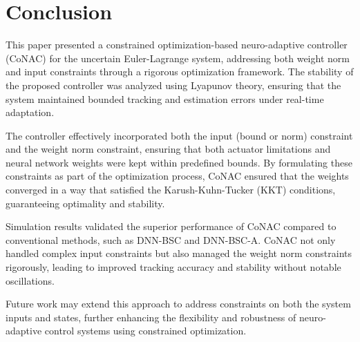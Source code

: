 \documentclass[lettersize,journal]{IEEEtran}
\begin{document}

\section{Conclusion}\label{sec:conclusion}

This paper presented a constrained optimization-based neuro-adaptive controller (CoNAC) for the uncertain Euler-Lagrange system, addressing both weight norm and input constraints through a rigorous optimization framework. The stability of the proposed controller was analyzed using Lyapunov theory, ensuring that the system maintained bounded tracking and estimation errors under real-time adaptation.

The controller effectively incorporated both the input (bound or norm) constraint and the weight norm constraint, ensuring that both actuator limitations and neural network weights were kept within predefined bounds. By formulating these constraints as part of the optimization process, CoNAC ensured that the weights converged in a way that satisfied the Karush-Kuhn-Tucker (KKT) conditions, guaranteeing optimality and stability.

Simulation results validated the superior performance of CoNAC compared to conventional methods, such as DNN-BSC and DNN-BSC-A. CoNAC not only handled complex input constraints but also managed the weight norm constraints rigorously, leading to improved tracking accuracy and stability without notable oscillations.

Future work may extend this approach to address constraints on both the system inputs and states, further enhancing the flexibility and robustness of neuro-adaptive control systems using constrained optimization.
\end{document}
